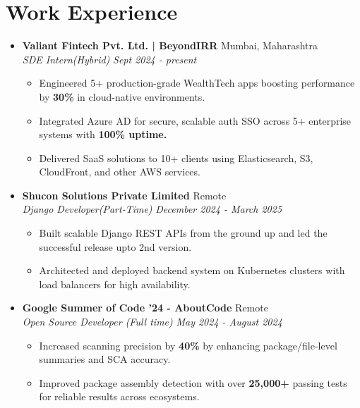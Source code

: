 \documentclass[7pt, legalpaper]{article}
\begin{document}
\section{Work Experience}
\begin{itemize}[leftmargin=*]

\item \textbf{Valiant Fintech Pvt. Ltd. | BeyondIRR}  \hfill {Mumbai, Maharashtra} \\
\textit{SDE Intern(Hybrid)}  \hfill \textit{Sept 2024 - present}
\begin{itemize}[label=$\diamond$]
    \item Engineered 5+ production-grade WealthTech apps boosting performance by \textbf{30\%} in cloud-native environments.
    \item Integrated Azure AD for secure, scalable auth SSO across 5+ enterprise systems with \textbf{100\% uptime.}
    \item Delivered SaaS solutions to 10+ clients using Elasticsearch, S3, CloudFront, and other AWS services.

\end{itemize}

\item \textbf{Shucon Solutions Private Limited}  \hfill {Remote} \\
\textit{Django Developer(Part-Time)}  \hfill \textit{December 2024 - March 2025}
\begin{itemize}[label=$\diamond$]
    \item Built scalable Django REST APIs from the ground up and led the successful release upto 2nd version. 
    \item Architected and deployed backend system on Kubernetes clusters with load balancers for high availability.
\end{itemize}

\item \textbf{Google Summer of Code '24 - AboutCode}  \hfill {Remote} \\
\textit{Open Source Developer (Full time)}  \hfill \textit{May 2024 - August 2024}
\begin{itemize}[label=$\diamond$]
    \item  Increased scanning precision by \textbf{40\%} by enhancing package/file-level summaries and SCA accuracy.
    \item Improved package assembly detection with over \textbf{25,000+} passing tests for reliable results across ecosystems.

\end{itemize}

\end{itemize}
\end{document}
